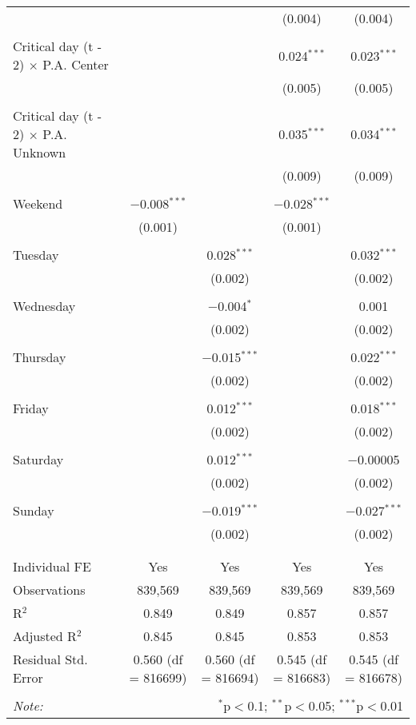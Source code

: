 \documentclass[
]{article}
\begin{document}
\begin{table}[!htbp]
{\begin{tabular}{@{\extracolsep{5pt}}lcccc}
  &  &  & (0.004) & (0.004) \\ 
  & & & & \\ 
 Critical day (t - 2) $\times$ P.A. Center &  &  & 0.024$^{***}$ & 0.023$^{***}$ \\ 
  &  &  & (0.005) & (0.005) \\ 
  & & & & \\ 
 Critical day (t - 2) $\times$ P.A. Unknown &  &  & 0.035$^{***}$ & 0.034$^{***}$ \\ 
  &  &  & (0.009) & (0.009) \\ 
  & & & & \\ 
 Weekend & $-$0.008$^{***}$ &  & $-$0.028$^{***}$ &  \\ 
  & (0.001) &  & (0.001) &  \\ 
  & & & & \\ 
 Tuesday &  & 0.028$^{***}$ &  & 0.032$^{***}$ \\ 
  &  & (0.002) &  & (0.002) \\ 
  & & & & \\ 
 Wednesday &  & $-$0.004$^{*}$ &  & 0.001 \\ 
  &  & (0.002) &  & (0.002) \\ 
  & & & & \\ 
 Thursday &  & $-$0.015$^{***}$ &  & 0.022$^{***}$ \\ 
  &  & (0.002) &  & (0.002) \\ 
  & & & & \\ 
 Friday &  & 0.012$^{***}$ &  & 0.018$^{***}$ \\ 
  &  & (0.002) &  & (0.002) \\ 
  & & & & \\ 
 Saturday &  & 0.012$^{***}$ &  & $-$0.00005 \\ 
  &  & (0.002) &  & (0.002) \\ 
  & & & & \\ 
 Sunday &  & $-$0.019$^{***}$ &  & $-$0.027$^{***}$ \\ 
  &  & (0.002) &  & (0.002) \\ 
  & & & & \\ 
\hline \\[-1.8ex] 
Individual FE & Yes & Yes & Yes & Yes \\ 
Observations & 839,569 & 839,569 & 839,569 & 839,569 \\ 
R$^{2}$ & 0.849 & 0.849 & 0.857 & 0.857 \\ 
Adjusted R$^{2}$ & 0.845 & 0.845 & 0.853 & 0.853 \\ 
Residual Std. Error & 0.560 (df = 816699) & 0.560 (df = 816694) & 0.545 (df = 816683) & 0.545 (df = 816678) \\ 
\hline 
\hline \\[-1.8ex] 
\textit{Note:}  & \multicolumn{4}{r}{$^{*}$p$<$0.1; $^{**}$p$<$0.05; $^{***}$p$<$0.01} \\ 
\end{tabular}
} 
\end{table} 
\newpage
\end{document}
